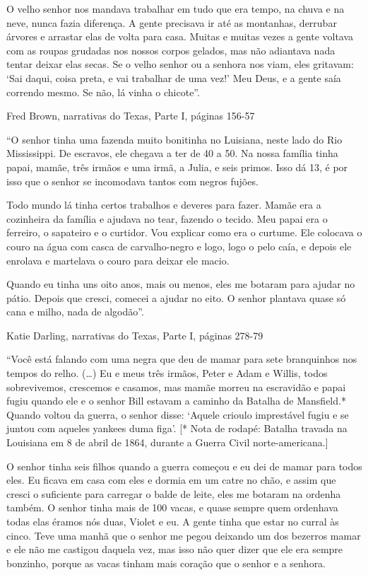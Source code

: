 O velho senhor nos mandava trabalhar em tudo que era tempo, na chuva e
na neve, nunca fazia diferença. A gente precisava ir até as montanhas,
derrubar árvores e arrastar elas de volta para casa. Muitas e muitas
vezes a gente voltava com as roupas grudadas nos nossos corpos gelados,
mas não adiantava nada tentar deixar elas secas. Se o velho senhor ou a
senhora nos viam, eles gritavam: `Sai daqui, coisa preta, e vai
trabalhar de uma vez!' Meu Deus, e a gente saía correndo mesmo. Se não,
lá vinha o chicote''.

Fred Brown, narrativas do Texas, Parte I, páginas 156-57

``O senhor tinha uma fazenda muito bonitinha no Luisiana, neste lado do
Rio Mississippi. De escravos, ele chegava a ter de 40 a 50. Na nossa
família tinha papai, mamãe, três irmãos e uma irmã, a Julia, e seis
primos. Isso dá 13, é por isso que o senhor se incomodava tantos com
negros fujões.

Todo mundo lá tinha certos trabalhos e deveres para fazer. Mamãe era a
cozinheira da família e ajudava no tear, fazendo o tecido. Meu papai era
o ferreiro, o sapateiro e o curtidor. Vou explicar como era o curtume.
Ele colocava o couro na água com casca de carvalho-negro e logo, logo o
pelo caía, e depois ele enrolava e martelava o couro para deixar ele
macio.

Quando eu tinha uns oito anos, mais ou menos, eles me botaram para
ajudar no pátio. Depois que cresci, comecei a ajudar no eito. O senhor
plantava quase só cana e milho, nada de algodão''.

Katie Darling, narrativas do Texas, Parte I, páginas 278-79

``Você está falando com uma negra que deu de mamar para sete branquinhos
nos tempos do relho. (\ldots{}) Eu e meus três irmãos, Peter e Adam e
Willis, todos sobrevivemos, crescemos e casamos, mas mamãe morreu na
escravidão e papai fugiu quando ele e o senhor Bill estavam a caminho da
Batalha de Mansfield.* Quando voltou da guerra, o senhor disse: `Aquele
crioulo imprestável fugiu e se juntou com aqueles yankees duma figa'.
{[}* Nota de rodapé: Batalha travada na Louisiana em 8 de abril de 1864,
durante a Guerra Civil norte-americana.{]}

O senhor tinha seis filhos quando a guerra começou e eu dei de mamar
para todos eles. Eu ficava em casa com eles e dormia em um catre no
chão, e assim que cresci o suficiente para carregar o balde de leite,
eles me botaram na ordenha também. O senhor tinha mais de 100 vacas, e
quase sempre quem ordenhava todas elas éramos nós duas, Violet e eu. A
gente tinha que estar no curral às cinco. Teve uma manhã que o senhor me
pegou deixando um dos bezerros mamar e ele não me castigou daquela vez,
mas isso não quer dizer que ele era sempre bonzinho, porque as vacas
tinham mais coração que o senhor e a senhora.

